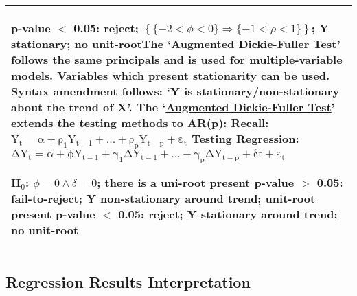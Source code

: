 \documentclass[11pt, english]{article}
\begin{document}
\begin{center}
\begin{longtable}{p{14cm}}
                p-value $<$ 0.05: reject; $\left\{\{-2<\phi<0\}\Rightarrow\{-1<\rho<1\}\right\}$; Y stationary; no unit-root\newline\newline
                [8.2] The `\underline{Augmented Dickie-Fuller Test}' follows the same principals and is used for multiple-variable models. Variables which present stationarity can be used. Syntax amendment follows: `Y is stationary/non-stationary about the trend of X'. The `\underline{Augmented Dickie-Fuller Test}' extends the testing methods to AR(p):\newline\newline
		Recall: $\mathrm{Y_t=\alpha+\rho_1Y_{t-1}+...+\rho_pY_{t-p}+\varepsilon_t}$\newline
                Testing Regression: $\mathrm{\Delta Y_t=\alpha+\phi Y_{t-1}+\gamma_1\Delta Y_{t-1}+...+\gamma_p\Delta Y_{t-p}+\delta t+\varepsilon_t}$\newline

                H$_0$: $\phi=0\land\delta=0$; there is a uni-root present\newline\newline
                p-value $>$ 0.05: fail-to-reject; Y non-stationary around trend; unit-root present\newline
                p-value $<$ 0.05: reject; Y stationary around trend; no unit-root\\
                \hline
        \end{longtable} 
        \end{center}

	\newpage

	\subsection{Regression Results Interpretation}
\end{document}

